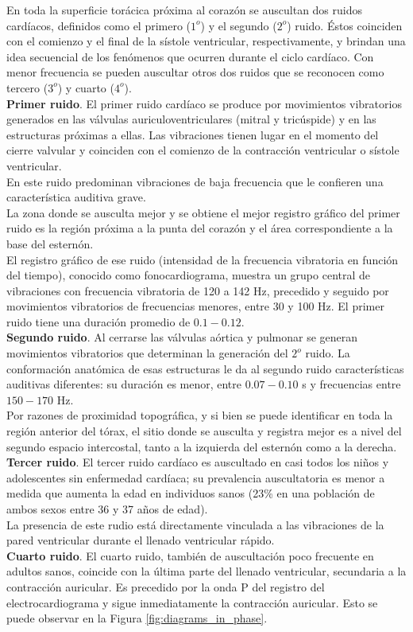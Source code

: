 En toda la superficie torácica próxima al corazón se auscultan dos ruidos cardíacos, definidos como el primero
($1^o$) y el segundo ($2^o$) ruido. Éstos coinciden con el comienzo y el final de la sístole ventricular,
respectivamente, y brindan una idea secuencial de los fenómenos que ocurren durante el ciclo cardíaco. Con menor
frecuencia se pueden auscultar otros dos ruidos que se reconocen como tercero ($3^o$) y cuarto ($4^o$). \\
\indent \textbf{Primer ruido}. El primer ruido cardíaco se produce por movimientos vibratorios generados en las
válvulas auriculoventriculares (mitral y tricúspide) y en las estructuras próximas a ellas. Las vibraciones tienen
lugar en el momento del cierre valvular y coinciden con el comienzo de la contracción ventricular o sístole
ventricular. \\
\indent En este ruido predominan vibraciones de baja frecuencia que le confieren una característica auditiva
grave. \\
\indent La zona donde se ausculta mejor y se obtiene el mejor registro gráfico del primer ruido es la región
próxima a la punta del corazón y el área correspondiente a la base del esternón. \\
\indent El registro gráfico de ese ruido (intensidad de la frecuencia vibratoria en función del tiempo),
conocido como fonocardiograma, muestra un grupo central de vibraciones con frecuencia vibratoria de 120 a 142 Hz,
precedido y seguido por movimientos vibratorios de frecuencias menores, entre 30 y 100 Hz. El primer ruido tiene una
duración promedio de $0.1-0.12$. \\
\indent \textbf{Segundo ruido}. Al cerrarse las válvulas aórtica y pulmonar se generan movimientos vibratorios
que determinan la generación del $2^o$ ruido. La conformación anatómica de esas estructuras le da al segundo ruido
características auditivas diferentes: su duración es menor, entre $0.07-0.10$ s y frecuencias entre $150-170$ Hz. \\
\indent Por razones de proximidad topográfica, y si bien se puede identificar en toda la región anterior del
tórax, el sitio donde se ausculta y registra mejor es a nivel del segundo espacio intercostal, tanto a la izquierda
del esternón como a la derecha.
\indent \textbf{Tercer ruido}. El tercer ruido cardíaco es auscultado en casi todos los niños y adolescentes sin
enfermedad cardíaca; su prevalencia auscultatoria es menor a medida que aumenta la edad en individuos sanos (23\% en
una población de ambos sexos entre 36 y 37 años de edad). \\
\indent La presencia de este rudio está directamente vinculada a las vibraciones de la pared ventricular durante
el llenado ventricular rápido. \\
\indent \textbf{Cuarto ruido}. El cuarto ruido, también de auscultación poco frecuente en adultos sanos,
coincide con la última parte del llenado ventricular, secundaria a la contracción auricular. Es precedido por la
onda P del registro del electrocardiograma y sigue inmediatamente la contracción auricular. Esto se puede observar
en la Figura \ref{fig:diagrams_in_phase}.

